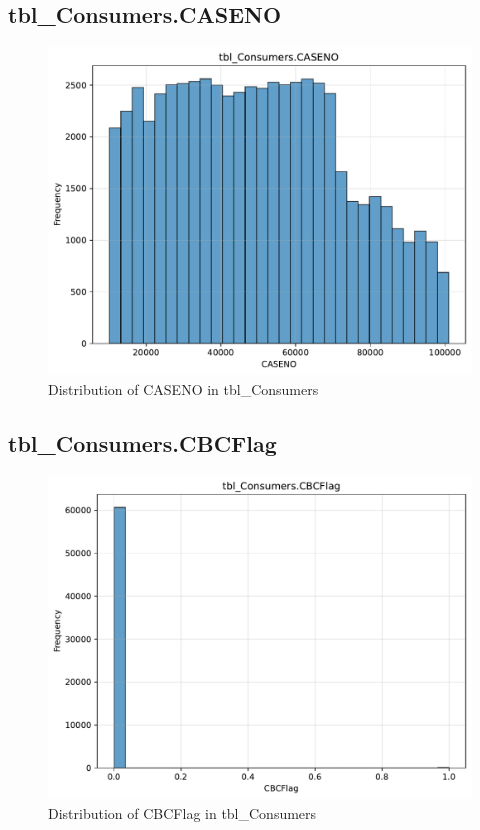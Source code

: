 \subsection{tbl\_Consumers.CASENO}

\begin{figure}[htbp]
\centering
\includegraphics[width=\textwidth]{figures/dbo_tbl_Consumers_CASENO.pdf}
\caption{Distribution of CASENO in tbl\_Consumers}
\end{figure}\newpage

\subsection{tbl\_Consumers.CBCFlag}

\begin{figure}[htbp]
\centering
\includegraphics[width=\textwidth]{figures/dbo_tbl_Consumers_CBCFlag.pdf}
\caption{Distribution of CBCFlag in tbl\_Consumers}
\end{figure}\newpage

